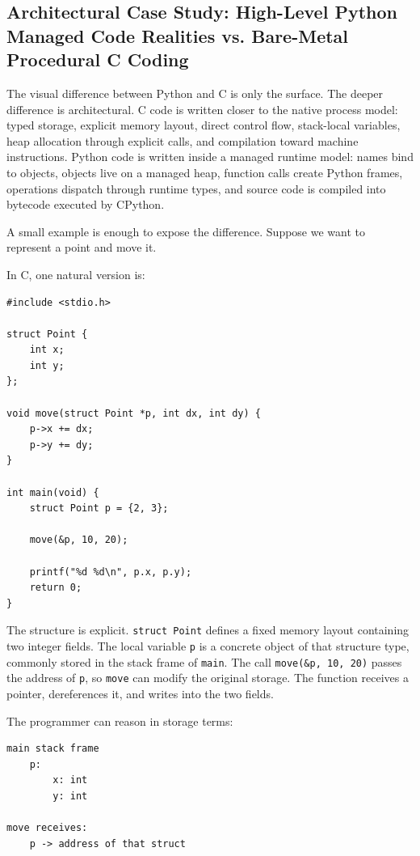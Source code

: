 \subsection{Architectural Case Study: High-Level Python Managed Code Realities vs. Bare-Metal Procedural C Coding}

The visual difference between Python and C is only the surface. The deeper difference is architectural. C code is written closer to the native process model: typed storage, explicit memory layout, direct control flow, stack-local variables, heap allocation through explicit calls, and compilation toward machine instructions. Python code is written inside a managed runtime model: names bind to objects, objects live on a managed heap, function calls create Python frames, operations dispatch through runtime types, and source code is compiled into bytecode executed by CPython.

A small example is enough to expose the difference. Suppose we want to represent a point and move it.

In C, one natural version is:

\begin{verbatim}
#include <stdio.h>

struct Point {
    int x;
    int y;
};

void move(struct Point *p, int dx, int dy) {
    p->x += dx;
    p->y += dy;
}

int main(void) {
    struct Point p = {2, 3};

    move(&p, 10, 20);

    printf("%d %d\n", p.x, p.y);
    return 0;
}
\end{verbatim}

The structure is explicit. \texttt{struct Point} defines a fixed memory layout containing two integer fields. The local variable \texttt{p} is a concrete object of that structure type, commonly stored in the stack frame of \texttt{main}. The call \texttt{move(\&p, 10, 20)} passes the address of \texttt{p}, so \texttt{move} can modify the original storage. The function receives a pointer, dereferences it, and writes into the two fields.

The programmer can reason in storage terms:

\begin{verbatim}
main stack frame
    p:
        x: int
        y: int

move receives:
    p -> address of that struct
\end{verbatim}


